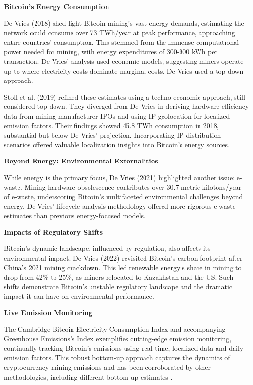 \documentclass[11pt]{report}
\begin{document}
\textbf{Bitcoin's Energy Consumption}

De Vries (2018) \cite{devriesBitcoinGrowingEnergy2018} shed light Bitcoin mining's vast energy demands, estimating the network could consume over 73 TWh/year at peak performance, approaching entire countries' consumption. This stemmed from the immense computational power needed for mining, with energy expenditures of 300-900 kWh per transaction. De Vries' analysis used economic models, suggesting miners operate up to where electricity costs dominate marginal costs. De Vries used a top-down approach.

Stoll et al. (2019) \cite{stollCarbonFootprintBitcoin2019} refined these estimates using a techno-economic approach, still considered top-down. They diverged from De Vries in deriving hardware efficiency data from mining manufacturer IPOs and using IP geolocation for localized emission factors. Their findings showed 45.8 TWh consumption in 2018, substantial but below De Vries' projection. Incorporating IP distribution scenarios offered valuable localization insights into Bitcoin's energy sources.

\textbf{Beyond Energy: Environmental Externalities}

While energy is the primary focus, De Vries (2021) \cite{devriesBitcoinGrowingEwaste2021} highlighted another issue: e-waste. Mining hardware obsolescence contributes over 30.7 metric kilotons/year of e-waste, underscoring Bitcoin's multifaceted environmental challenges beyond energy. De Vries' lifecycle analysis methodology offered more rigorous e-waste estimates than previous energy-focused models.

\textbf{Impacts of Regulatory Shifts}


Bitcoin's dynamic landscape, influenced by regulation, also affects its environmental impact. De Vries (2022)\cite{devriesRevisitingBitcoinCarbon2022}  revisited Bitcoin's carbon footprint after China's 2021 mining crackdown. This led renewable energy's share in mining to drop from 42\% to 25\%, as miners relocated to Kazakhstan and the US. Such shifts demonstrate Bitcoin's unstable regulatory landscape and the dramatic impact it can have on environmental performance.

\textbf{Live Emission Monitoring}

The Cambridge Bitcoin Electricity Consumption Index \cite{neumuellerCambridgeBitcoinElectricity2021} and accompanying Greenhouse Emissions's Index
exemplifies cutting-edge emission monitoring, continually tracking Bitcoin's emissions using real-time, localized data and daily emission factors. This robust bottom-up approach captures the dynamics of cryptocurrency mining emissions and has been corroborated by other methodologies, including different bottom-up estimates \cite{mcdonaldEthereumEmissionsBottomup2022}.
\end{document}
